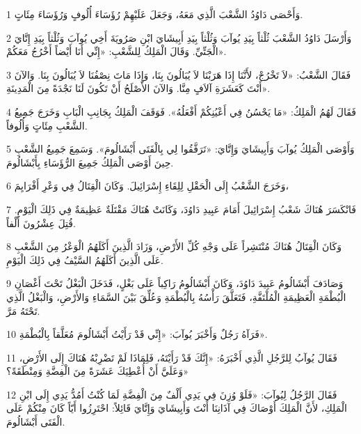 \par 1 وَأَحْصَى دَاوُدُ الشَّعْبَ الَّذِي مَعَهُ، وَجَعَلَ عَلَيْهِمْ رُؤَسَاءَ أُلُوفٍ وَرُؤَسَاءَ مِئَاتٍ.
\par 2 وَأَرْسَلَ دَاوُدُ الشَّعْبَ ثُلْثاً بِيَدِ يُوآبَ وَثُلْثاً بِيَدِ أَبِيشَايَ ابْنِ صَرُويَةَ أَخِي يُوآبَ وَثُلْثاً بِيَدِ إِتَّايَ الْجَتِّيِّ. وَقَالَ الْمَلِكُ لِلشَّعْبِ: «إِنِّي أَنَا أَيْضاً أَخْرُجُ مَعَكُمْ».
\par 3 فَقَالَ الشَّعْبُ: «لاَ تَخْرُجْ، لأَنَّنَا إِذَا هَرَبْنَا لاَ يُبَالُونَ بِنَا، وَإِذَا مَاتَ نِصْفُنَا لاَ يُبَالُونَ بِنَا. وَالآنَ أَنْتَ كَعَشَرَةِ آلاَفٍ مِنَّا. وَالآنَ الأَصْلَحُ أَنْ تَكُونَ لَنَا نَجْدَةً مِنَ الْمَدِينَةِ».
\par 4 فَقَالَ لَهُمُ الْمَلِكُ: «مَا يَحْسُنُ فِي أَعْيُنِكُمْ أَفْعَلُهُ». فَوَقَفَ الْمَلِكُ بِجَانِبِ الْبَابِ وَخَرَجَ جَمِيعُ الشَّعْبِ مِئَاتٍ وَأُلُوفاً.
\par 5 وَأَوْصَى الْمَلِكُ يُوآبَ وَأَبِيشَايَ وَإِتَّايَ: «تَرَفَّقُوا لِي بِالْفَتَى أَبْشَالُومَ». وَسَمِعَ جَمِيعُ الشَّعْبِ حِينَ أَوْصَى الْمَلِكُ جَمِيعَ الرُّؤَسَاءِ بِأَبْشَالُومَ.
\par 6 وَخَرَجَ الشَّعْبُ إِلَى الْحَقْلِ لِلِقَاءِ إِسْرَائِيلَ. وَكَانَ الْقِتَالُ فِي وَعْرِ أَفْرَايِمَ،
\par 7 فَانْكَسَرَ هُنَاكَ شَعْبُ إِسْرَائِيلَ أَمَامَ عَبِيدِ دَاوُدَ، وَكَانَتْ هُنَاكَ مَقْتَلَةٌ عَظِيمَةٌ فِي ذَلِكَ الْيَوْمِ. قُتِلَ عِشْرُونَ أَلْفاً.
\par 8 وَكَانَ الْقِتَالُ هُنَاكَ مُنْتَشِراً عَلَى وَجْهِ كُلِّ الأَرْضِ، وَزَادَ الَّذِينَ أَكَلَهُمُ الْوَعْرُ مِنَ الشَّعْبِ عَلَى الَّذِينَ أَكَلَهُمُ السَّيْفُ فِي ذَلِكَ الْيَوْمِ.
\par 9 وَصَادَفَ أَبْشَالُومُ عَبِيدَ دَاوُدَ، وَكَانَ أَبْشَالُومُ رَاكِباً عَلَى بَغْلٍ، فَدَخَلَ الْبَغْلُ تَحْتَ أَغْصَانِ الْبُطْمَةِ الْعَظِيمَةِ الْمُلْتَفَّةِ، فَتَعَلَّقَ رَأْسُهُ بِالْبُطْمَةِ وَعُلِّقَ بَيْنَ السَّمَاءِ وَالأَرْضِ، وَالْبَغْلُ الَّذِي تَحْتَهُ مَرَّ.
\par 10 فَرَآهُ رَجُلٌ وَأَخْبَرَ يُوآبَ: «إِنِّي قَدْ رَأَيْتُ أَبْشَالُومَ مُعَلَّقاً بِالْبُطْمَةِ».
\par 11 فَقَالَ يُوآبُ لِلرَّجُلِ الَّذِي أَخْبَرَهُ: «إِنَّكَ قَدْ رَأَيْتَهُ، فَلِمَاذَا لَمْ تَضْرِبْهُ هُنَاكَ إِلَى الأَرْضِ، وَعَلَيَّ أَنْ أُعْطِيَكَ عَشَرَةً مِنَ الْفِضَّةِ وَمِنْطَقَةً؟»
\par 12 فَقَالَ الرَّجُلُ لِيُوآبَ: «فَلَوْ وُزِنَ فِي يَدِي أَلْفٌ مِنَ الْفِضَّةِ لَمَا كُنْتُ أَمُدُّ يَدِي إِلَى ابْنِ الْمَلِكِ، لأَنَّ الْمَلِكَ أَوْصَاكَ فِي آذَانِنَا أَنْتَ وَأَبِيشَايَ وَإِتَّايَ قَائِلاً: احْتَرِزُوا أَيّاً كَانَ مِنْكُمْ عَلَى الْفَتَى أَبْشَالُومَ.
